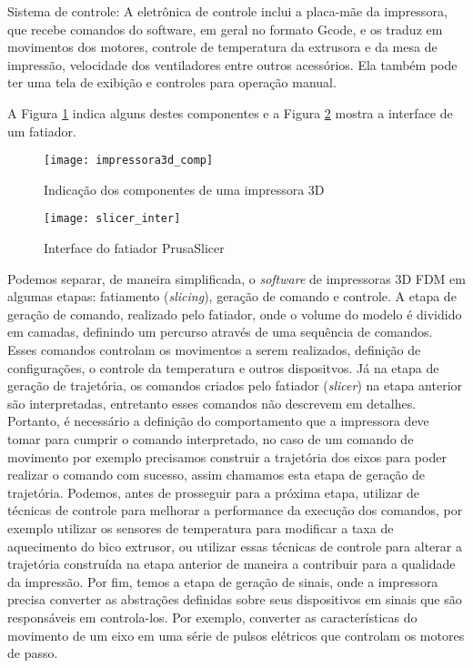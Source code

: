 Sistema de controle: A eletrônica de controle inclui a placa-mãe da impressora, que recebe comandos do software, em geral no formato Gcode, e os traduz em movimentos dos motores, controle de temperatura da extrusora e da mesa de impressão, velocidade dos ventiladores entre outros acessórios. Ela também pode ter uma tela de exibição e controles para operação manual.

A Figura \ref{fig:impressora3d_comp} indica alguns destes componentes e a Figura \ref{fig:slicer_inter} mostra a interface de um fatiador.

\begin{figure}[H]
    \centering
    \caption{Indicação dos componentes de uma impressora 3D}
    \texttt{[image: impressora3d\_comp]}
    \label{fig:impressora3d_comp}
\end{figure}

\begin{figure}[H]
    \centering
    \caption{Interface do fatiador PrusaSlicer}
    \texttt{[image: slicer\_inter]}
    \label{fig:slicer_inter}
\end{figure}

Podemos separar, de maneira simplificada, o \textit{software} de impressoras 3D FDM em algumas etapas: fatiamento (\textit{slicing}), geração de comando e controle. A etapa de geração de comando, realizado pelo fatiador, onde o volume do modelo é dividido em camadas, definindo um percurso através de uma sequência de comandos. Esses comandos controlam os movimentos a serem realizados, definição de configurações, o controle da temperatura e outros dispositvos. Já na etapa de geração de trajetória, os comandos criados pelo fatiador (\textit{slicer}) na etapa anterior são interpretadas, entretanto esses comandos não descrevem em detalhes. Portanto, é necessário a definição do comportamento que a impressora deve tomar para cumprir o comando interpretado, no caso de um comando de movimento por exemplo precisamos construir a trajetória dos eixos para poder realizar o comando com sucesso, assim chamamos esta etapa de geração de trajetória. Podemos, antes de prosseguir para a próxima etapa, utilizar de técnicas de controle para melhorar a performance da execução dos comandos, por exemplo utilizar os sensores de temperatura para modificar a taxa de aquecimento do bico extrusor, ou utilizar essas técnicas de controle para alterar a trajetória construída na etapa anterior de maneira a contribuir para a qualidade da impressão. Por fim, temos a etapa de geração de sinais, onde a impressora precisa converter as abstrações definidas sobre seus dispositivos em sinais que são responsáveis em controla-los. Por exemplo, converter as características do movimento de um eixo em uma série de pulsos elétricos que controlam os motores de passo. 

